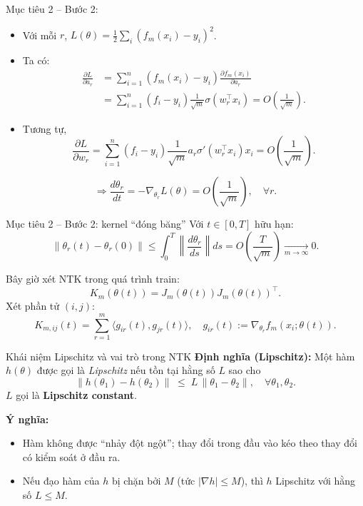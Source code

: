 \begin{frame}{Mục tiêu 2 – Bước 2:}
  \begin{itemize}
    \item Với mỗi $r$, $L(\theta) = \tfrac12\sum_i (f_m(x_i)-y_i)^2$.
\item Ta có:
\[
\begin{aligned}
\frac{\partial L}{\partial a_r}
&= \sum_{i=1}^n (f_m(x_i)-y_i)
      \frac{\partial f_m(x_i)}{\partial a_r} \\
&= \sum_{i=1}^n (f_i-y_i)\frac{1}{\sqrt{m}}\sigma(w_r^\top x_i)
 = O\!\left(\frac{1}{\sqrt{m}}\right).
\end{aligned}
\]

    \item Tương tự,
      \[
        \frac{\partial L}{\partial w_r}
        = \sum_{i=1}^n (f_i-y_i)
            \frac{1}{\sqrt{m}} a_r \sigma'(w_r^\top x_i)x_i
        = O\!\left(\frac{1}{\sqrt{m}}\right).
      \]
  \end{itemize}

  \[ \Rightarrow
    \frac{d\theta_r}{dt}
    = -\nabla_{\theta_r}L(\theta)
    = O\!\left(\frac{1}{\sqrt{m}}\right),
    \quad \forall r.
  \]
\end{frame}

\begin{frame}{Mục tiêu 2 – Bước 2: kernel ``đóng băng''}
  Với $t \in [0,T]$ hữu hạn:
  \[
    \|\theta_r(t) - \theta_r(0)\|
    \le \int_0^T \left\| \frac{d\theta_r}{ds} \right\| ds
    = O\!\left(\frac{T}{\sqrt{m}}\right)
    \xrightarrow[m\to\infty]{} 0.
  \]

  \vspace{0.2cm}
  Bây giờ xét NTK trong quá trình train:
  \[
    K_m(\theta(t)) = J_m(\theta(t))J_m(\theta(t))^\top.
  \]
  Xét phần tử $(i,j)$:
  \[
    K_{m,ij}(t)
      = \sum_{r=1}^m \big\langle g_{ir}(t), g_{jr}(t)\big\rangle,
    \quad
    g_{ir}(t) := \nabla_{\theta_r} f_m(x_i;\theta(t)).
  \]
\end{frame}

\begin{frame}{Khái niệm Lipschitz và vai trò trong NTK}
\textbf{Định nghĩa (Lipschitz):}
Một hàm $h(\theta)$ được gọi là \emph{Lipschitz} nếu tồn tại hằng số $L$ sao cho
\[
  \|h(\theta_1) - h(\theta_2)\|
  \;\le\;
  L \, \|\theta_1 - \theta_2\|,
  \quad \forall\theta_1,\theta_2.
\]
$L$ gọi là \textbf{Lipschitz constant}.

\vspace{0.3cm}
\textbf{Ý nghĩa:}
\begin{itemize}
  \item Hàm không được “nhảy đột ngột”; thay đổi trong đầu vào kéo theo thay đổi có kiểm soát ở đầu ra.
  \item Nếu đạo hàm của $h$ bị chặn bởi $M$ (tức $|\nabla h|\le M$), thì $h$ Lipschitz với hằng số $L\le M$.
\end{itemize}
\end{frame}

